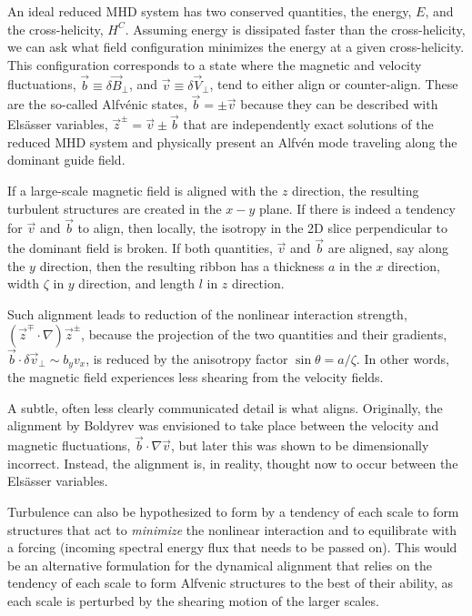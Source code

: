 \documentclass[usenatbib,twocolumn, twocolappendix]{aastex63}
\begin{document}
An ideal reduced MHD system has two conserved quantities, the energy, $E$, and the cross-helicity, $H^C$.
Assuming energy is dissipated faster than the cross-helicity, we can ask what field configuration minimizes the energy at a given cross-helicity.
This configuration corresponds to a state where the magnetic and velocity fluctuations, $\vec{b}\equiv \delta \vec{B}_\perp$, and $\vec{v}\equiv \delta \vec{V}_\perp$, tend to either align or counter-align.
These are the so-called Alfv\'enic  states, $\vec{b} = \pm \vec{v}$ because they can be described with Els\"asser  variables, $\vec{z}^\pm = \vec{v} \pm \vec{b}$ that are independently exact solutions of the reduced MHD system and physically present an Alfv\'en mode traveling along the dominant guide field.


If a large-scale magnetic field is aligned with the $z$ direction, the resulting turbulent structures are created in the $x-y$ plane.
If there is indeed a tendency for $\vec{v}$ and $\vec{b}$ to align, then locally, the isotropy in the 2D slice perpendicular to the dominant field is broken.
If both quantities, $\vec{v}$ and $\vec{b}$ are aligned, say along the $y$ direction, then the resulting ribbon has a thickness $a$ in the $x$ direction, width $\zeta$ in $y$ direction, and length $l$ in $z$ direction.

Such alignment leads to reduction of the nonlinear interaction strength, $(\vec{z}^\mp \cdot \nabla)\vec{z}^\pm$, because the projection of the two quantities and their gradients, $\vec{b}\cdot\delta\vec{v}_\perp \sim b_y v_x$, is reduced by the anisotropy factor $\sin\theta = a/\zeta$.
In other words, the magnetic field experiences less shearing from the velocity fields.

A subtle, often less clearly communicated detail is what aligns.
Originally, the alignment by Boldyrev was envisioned to take place between the velocity and magnetic fluctuations, $\vec{b} \cdot \nabla \vec{v}$, but later this was shown to be dimensionally incorrect. 
Instead, the alignment is, in reality, thought now to occur between the Els\"asser  variables. %

Turbulence can also be hypothesized to form by a tendency of each scale to form structures that act to \textit{minimize} the nonlinear interaction and to equilibrate with a forcing (incoming spectral energy flux that needs to be passed on).
This would be an alternative formulation for the dynamical alignment that relies on the tendency of each scale to form Alfvenic structures to the best of their ability, as each scale is perturbed by the shearing motion of the larger scales. 
\end{document}
